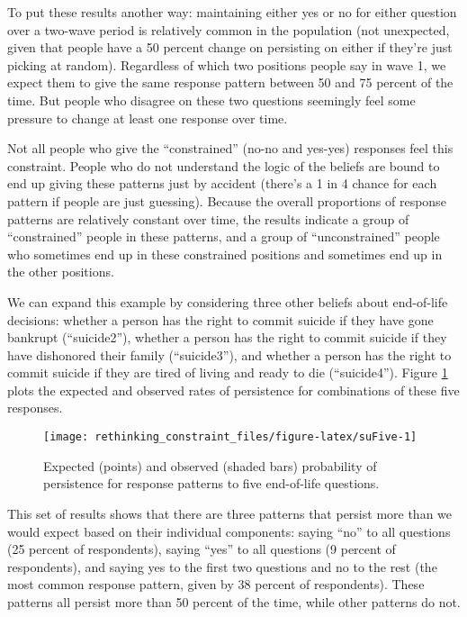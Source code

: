 \documentclass[12pt,]{article}
\begin{document}
To put these results another way: maintaining either yes or no for either question over a two-wave period is relatively common in the population (not unexpected, given that people have a 50 percent change on persisting on either if they're just picking at random). Regardless of which two positions people say in wave 1, we expect them to give the same response pattern between 50 and 75 percent of the time. But people who disagree on these two questions seemingly feel some pressure to change at least one response over time.

Not all people who give the ``constrained'' (no-no and yes-yes) responses feel this constraint. People who do not understand the logic of the beliefs are bound to end up giving these patterns just by accident (there's a 1 in 4 chance for each pattern if people are just guessing). Because the overall proportions of response patterns are relatively constant over time, the results indicate a group of ``constrained'' people in these patterns, and a group of ``unconstrained'' people who sometimes end up in these constrained positions and sometimes end up in the other positions.

We can expand this example by considering three other beliefs about end-of-life decisions: whether a person has the right to commit suicide if they have gone bankrupt (``suicide2''), whether a person has the right to commit suicide if they have dishonored their family (``suicide3''), and whether a person has the right to commit suicide if they are tired of living and ready to die (``suicide4''). Figure \ref{fig:suFive} plots the expected and observed rates of persistence for combinations of these five responses.

\begin{figure}[t]
\texttt{[image: rethinking\_constraint\_files/figure-latex/suFive-1]} \caption{Expected (points) and observed (shaded bars) probability of persistence for response patterns to five end-of-life questions.}\label{fig:suFive}
\end{figure}

This set of results shows that there are three patterns that persist more than we would expect based on their individual components: saying ``no'' to all questions (25 percent of respondents), saying ``yes'' to all questions (9 percent of respondents), and saying yes to the first two questions and no to the rest (the most common response pattern, given by 38 percent of respondents). These patterns all persist more than 50 percent of the time, while other patterns do not.
\end{document}
